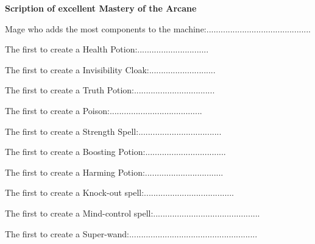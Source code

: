\documentclass[white]{guildcamp3}
\begin{document}
\name{\wMageRivalry{}} %

\large\textbf{Scription of excellent Mastery of the Arcane}  


Mage who adds the most components to the machine:............................................

The first to create a Health Potion:..............................

The first to create a Invisibility Cloak:............................

The first to create a Truth Potion:..................................

The first to create a Poison:.......................................

The first to create a Strength Spell:...................................

The first to create a Boosting Potion:..................................

The first to create a Harming Potion:.................................

The first to create a Knock-out spell:......................................

The first to create a Mind-control spell:.............................................

The first to create a Super-wand:......................................................

\end{document}
